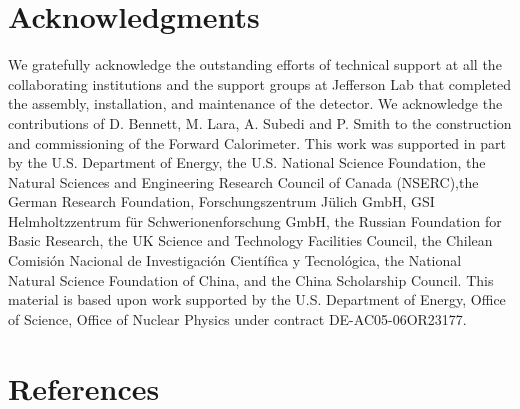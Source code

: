 \documentclass{elsarticle}
\begin{document}


\tableofcontents




% 







  




   


\section{Acknowledgments}  
We gratefully acknowledge the outstanding efforts of technical support at all the collaborating institutions and the support groups at Jefferson Lab that completed the assembly, installation,
and maintenance of the detector. We acknowledge the contributions of D. Bennett, M. Lara, A. Subedi and P. Smith to the construction and commissioning of the Forward Calorimeter. This work was supported in part by the U.S. Department of Energy, the U.S. National Science Foundation, the Natural Sciences and Engineering Research Council of Canada (NSERC),the German Research Foundation, Forschungszentrum J\"ulich GmbH, GSI Helmholtzzentrum f\"{u}r Schwerionenforschung GmbH, the Russian Foundation for Basic Research, the UK Science and Technology Facilities Council, the Chilean Comisi\'{o}n Nacional de Investigaci\'{o}n Cient\'{i}fica y Tecnol\'{o}gica, the National Natural Science Foundation of China, and the China Scholarship Council. This material is based upon work supported by the U.S. Department of Energy, Office of Science, Office of Nuclear Physics under contract DE-AC05-06OR23177. 

\newpage

\section*{References}
   

%
%

\end{document}
